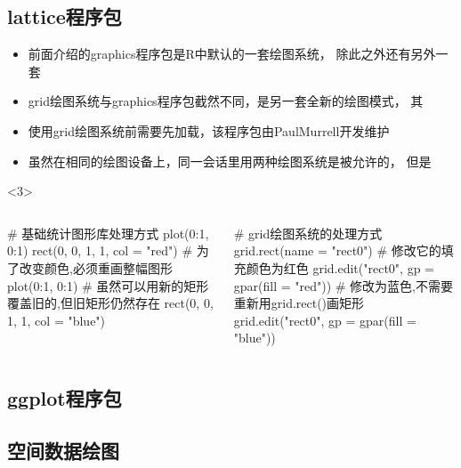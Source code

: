 \subsection{lattice程序包}
\begin{frame}[t,fragile]{\subsecname}{}
\begin{itemize}
\item<1-> 前面介绍的graphics程序包是R中默认的一套绘图系统，
除此之外还有另外一套
\item<2-> grid绘图系统与graphics程序包截然不同，是另一套全新的绘图模式，
其
\item<3-> 使用grid绘图系统前需要先加载，该程序包由PaulMurrell开发维护
\item<3-> 虽然在相同的绘图设备上，同一会话里用两种绘图系统是被允许的，
但是
\end{itemize}

\begin{overlayarea}{\textwidth}{\textheight}

\begin{onlyenv}<3>
\begin{columns}
  \begin{column}[t]{.5\textwidth}
    \begin{rcode}
# 基础统计图形库处理方式
plot(0:1, 0:1)
rect(0, 0, 1, 1, col = "red")
# 为了改变颜色,必须重画整幅图形
plot(0:1, 0:1)
# 虽然可以用新的矩形覆盖旧的,但旧矩形仍然存在
rect(0, 0, 1, 1, col = "blue")
    \end{rcode} 
  \end{column}

  \begin{column}[t]{.5\textwidth}
    \begin{rcode}
# grid绘图系统的处理方式
grid.rect(name = "rect0")
# 修改它的填充颜色为红色
grid.edit("rect0", gp = gpar(fill = "red"))
# 修改为蓝色,不需要重新用grid.rect()画矩形
grid.edit("rect0", gp = gpar(fill = "blue"))
    \end{rcode} 
  \end{column}
\end{columns} 
\end{onlyenv}
\end{overlayarea}  
\end{frame} 
\subsection{ggplot程序包}

\subsection{空间数据绘图}
